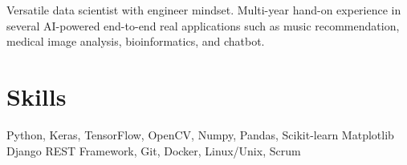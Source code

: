 \documentclass[11pt]{article} %
\begin{document}
{\noindent\begin{minipage}[t]{0.8\textwidth}
	\vspace{0.5em}
	Versatile data scientist with engineer mindset. Multi-year hand-on experience in several AI-powered end-to-end real applications such as music recommendation, medical image analysis, bioinformatics, and chatbot.
\section{Skills}

Python, Keras, TensorFlow, OpenCV, Numpy, Pandas, Scikit-learn Matplotlib \\
Django REST Framework, Git, Docker, Linux/Unix, Scrum \\
\end{minipage}\hspace{1mm}
\begin{minipage}[t]{0.2\textwidth}


\end{minipage}}
\end{document}
